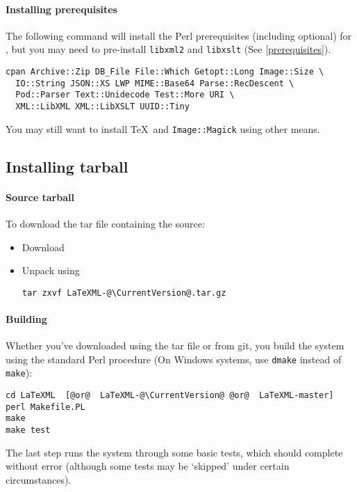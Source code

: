 \documentclass{article}
\begin{document}
\paragraph{Installing prerequisites}\label{install.cpan.prereq}
The following command will install the Perl prerequisites (including optional)
for \LaTeXML, but you may need to pre-install \texttt{libxml2} and  \texttt{libxslt} (See \ref{prerequisites}).
\begin{lstlisting}[style=shell]
cpan Archive::Zip DB_File File::Which Getopt::Long Image::Size \
  IO::String JSON::XS LWP MIME::Base64 Parse::RecDescent \
  Pod::Parser Text::Unidecode Test::More URI \
  XML::LibXML XML::LibXSLT UUID::Tiny
\end{lstlisting}
You may still want to install \TeX\ and \texttt{Image::Magick}
using other means.

\subsection{Installing tarball}\label{install.tarball}
\paragraph{Source tarball}\label{source.tarball}
To download the tar file containing the source:
\begin{itemize}
\item Download \CurrentTarball
\item Unpack using
\begin{lstlisting}[style=shell]
tar zxvf LaTeXML-@\CurrentVersion@.tar.gz
\end{lstlisting}
\end{itemize}

\paragraph{Building}\label{build.source}
Whether you've downloaded using the tar file or from git,
you build the system using the standard Perl procedure
(On Windows systems, use \texttt{dmake} instead of \texttt{make}):
\begin{lstlisting}[style=shell]
cd LaTeXML  [@or@  LaTeXML-@\CurrentVersion@ @or@  LaTeXML-master]
perl Makefile.PL
make
make test
\end{lstlisting}
The last step runs the system through some basic tests,
which should complete without error (although some tests may be `skipped'
under certain circumstances).
\end{document}
